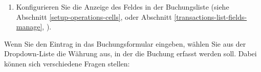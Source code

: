 \begin{enumerate}
	\Note{}: Die Felder  und  sind im Bunchungsformular miteinander verknüpft: Wenn Sie die Darstellung des Feldes  im Formular anpassen, wird das Feld  automatisch an derselben Stelle positioniert und umgekehrt; anschließend können Sie beide Felder an die gewünschten Zellen verschieben.
	\item Konfigurieren Sie die Anzeige des Feldes  in der Buchungsliste (siehe Abschnitt \vref{setup-operations-cells},  oder Abschnitt \vref{transactions-list-fields-manage}, ).
\end{enumerate}

Wenn Sie den Eintrag  in das Buchungsformular eingeben, wählen Sie aus der Dropdown-Liste die Währung aus, in der die Buchung erfasst werden soll. Dabei können sich verschiedene Fragen stellen:

